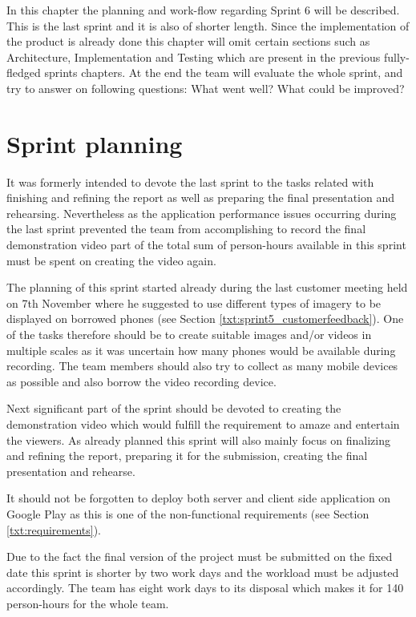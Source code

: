 In this chapter the planning and work-flow regarding Sprint 6 will be described. This is the last sprint and it is also of shorter length. Since the implementation of the product is already done this chapter will omit certain sections such as Architecture, Implementation and Testing which are present in the previous fully-fledged sprints chapters. At the end the team will evaluate the whole sprint, and try to answer on following questions: What went well? What could be improved?  

\section{Sprint planning}
It was formerly intended to devote the last sprint to the tasks related with finishing and refining the report as well as preparing the final presentation and rehearsing. Nevertheless as the application performance issues occurring during the last sprint prevented the team from accomplishing to record the final demonstration video part of the total sum of person-hours available in this sprint must be spent on creating the video again.

The planning of this sprint started already during the last customer meeting held on 7th November where he suggested to use different types of imagery to be displayed on borrowed phones (see Section \ref{txt:sprint5_customerfeedback}). One of the tasks therefore should be to create suitable images and/or videos in multiple scales as it was uncertain how many phones would be available during recording. The team members should also try to collect as many mobile devices as possible and also borrow the video recording device.

Next significant part of the sprint should be devoted to creating the demonstration video which would fulfill the requirement to amaze and entertain the viewers. As already planned this sprint will also mainly focus on finalizing and refining the report, preparing it for the submission, creating the final presentation and rehearse.

It should not be forgotten to deploy both server and client side application on Google Play as this is one of the non-functional requirements (see Section \ref{txt:requirements}).

Due to the fact the final version of the project must be submitted on the fixed date this sprint is shorter by two work days and the workload must be adjusted accordingly. The team has eight work days to its disposal which makes it for 140 person-hours for the whole team.

